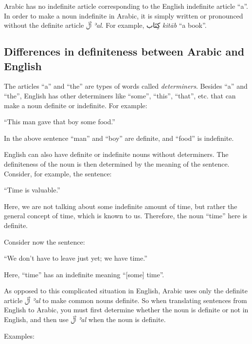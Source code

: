 \documentclass[
  10pt,
]{book}
\begin{document}
Arabic has no indefinite article corresponding to the English indefinite article \enquote{a}. In order to make a noun indefinite in Arabic, it is simply written or pronounced without the definite article
\foreignlanguage{arabic}{ٱَلْ} \emph{ʾal}.
For example, \foreignlanguage{arabic}{کِتَاب} \emph{kitāb} \enquote{a book}.

\subsection{Differences in definiteness between Arabic and English}\label{differences-in-definiteness-between-arabic-and-english}

The articles \enquote{a} and \enquote{the} are types of words called \emph{determiners}. Besides \enquote{a} and \enquote{the}, English has other determiners like \enquote{some}, \enquote{this}, \enquote{that}, etc. that can make a noun definite or indefinite.
For example:

\enquote{This man gave that boy some food.}

In the above sentence \enquote{man} and \enquote{boy} are definite, and \enquote{food} is indefinite.

English can also have definite or indefinite nouns without determiners. The definiteness of the noun is then determined by the meaning of the sentence. Consider, for example, the sentence:

\enquote{Time is valuable.}

Here, we are not talking about some indefinite amount of time, but rather the general concept of time, which is known to us. Therefore, the noun \enquote{time} here is definite.

Consider now the sentence:

\enquote{We don't have to leave just yet; we have time.}

Here, \enquote{time} has an indefinite meaning \enquote{{[}some{]} time}.

As opposed to this complicated situation in English, Arabic uses only the definite article
\foreignlanguage{arabic}{ٱَلْ} \emph{ʾal}
to make common nouns definite.
So when translating sentences from English to Arabic, you must first determine whether the noun is definite or not in English, and then use
\foreignlanguage{arabic}{ٱَلْ} \emph{ʾal}
when the noun is definite.

Examples:
\end{document}
